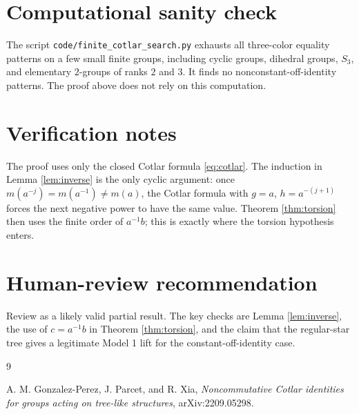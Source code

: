 \documentclass[11pt]{article}
\begin{document}
\section*{Computational sanity check}

The script \texttt{code/finite\_cotlar\_search.py} exhausts all three-color
equality patterns on a few small finite groups, including cyclic groups,
dihedral groups, \(S_3\), and elementary \(2\)-groups of ranks \(2\) and \(3\).
It finds no nonconstant-off-identity patterns. The proof above does not rely
on this computation.

\section*{Verification notes}

The proof uses only the closed Cotlar formula \eqref{eq:cotlar}. The induction
in Lemma \ref{lem:inverse} is the only cyclic argument: once
\(m(a^{-j})=m(a^{-1})\ne m(a)\), the Cotlar formula with
\(g=a\), \(h=a^{-(j+1)}\) forces the next negative power to have the same
value. Theorem \ref{thm:torsion} then uses the finite order of \(a^{-1}b\);
this is exactly where the torsion hypothesis enters.

\section*{Human-review recommendation}

Review as a likely valid partial result. The key checks are Lemma
\ref{lem:inverse}, the use of \(c=a^{-1}b\) in Theorem \ref{thm:torsion}, and
the claim that the regular-star tree gives a legitimate Model 1 lift for the
constant-off-identity case.

\begin{thebibliography}{9}

A. M. Gonzalez-Perez, J. Parcet, and R. Xia,
\emph{Noncommutative Cotlar identities for groups acting on tree-like
structures}, arXiv:2209.05298.

\end{thebibliography}
\end{document}
